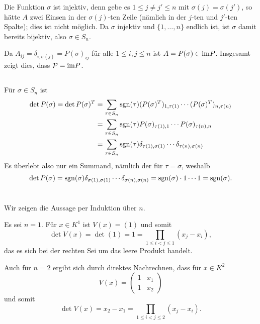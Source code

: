 \documentclass[a4paper,10pt]{article}
\begin{document}
Die Funktion $\sigma$ ist injektiv, denn gebe es $1 \leq j \neq j' \leq n$ mit $\sigma(j) = \sigma(j')$, so hätte $A$ zwei Einsen in der $\sigma(j)$-ten Zeile (nämlich in der $j$-ten und $j'$-ten Spalte); dies ist nicht möglich. Da $\sigma$ injektiv und $\{1, \dotsc, n\}$ endlich ist, ist $\sigma$ damit bereits bijektiv, also $\sigma \in S_n$.

Da $A_{ij} = \delta_{i,\sigma(j)} = P(\sigma)_{ij}$ für alle $1 \leq i,j \leq n$ ist $A = P(\sigma) \in \mathrm{im} P$. Insgesamt zeigt dies, dass $\mathcal{P} = \mathrm{im} P$.


\subsection{}
Für $\sigma \in S_n$ ist
\begin{align*}
 \det P(\sigma)
 = \det P(\sigma)^T
 &= \sum_{\tau \in S_n} \operatorname{sgn}(\tau) (P(\sigma)^T)_{1, \tau(1)} \dotsm (P(\sigma)^T)_{n, \tau(n)} \\
 &= \sum_{\tau \in S_n} \operatorname{sgn}(\tau) P(\sigma)_{\tau(1), 1} \dotsm P(\sigma)_{\tau(n),n} \\
 &= \sum_{\tau \in S_n} \operatorname{sgn}(\tau) \delta_{\tau(1), \sigma(1)} \dotsm \delta_{\tau(n),\sigma(n)}
\end{align*}
Es überlebt also nur ein Summand, nämlich der für $\tau = \sigma$, weshalb
\[
 \det P(\sigma)
 = \operatorname{sgn}(\sigma) \delta_{\sigma(1), \sigma(1)} \dotsm \delta_{\sigma(n),\sigma(n)}
 = \operatorname{sgn}(\sigma) \cdot 1 \dotsm 1
 = \operatorname{sgn}(\sigma).
\]





\section{}
Wir zeigen die Aussage per Induktion über $n$.

\begin{ia}
 Es sei $n = 1$. Für $x \in K^1$ ist $V(x) = (1)$ und somit
 \[
  \det V(x) = \det (1) = 1 = \prod_{1 \leq i < j \leq 1} (x_j - x_i),
 \]
 das es sich bei der rechten Sei um das leere Produkt handelt.
 
 Auch für $n = 2$ ergibt sich durch direktes Nachrechnen, dass für $x \in K^2$
 \[
  V(x) =
  \begin{pmatrix}
   1 & x_1 \\
   1 & x_2
  \end{pmatrix}
 \]
 und somit
 \[
  \det V(x) = x_2 - x_1 =  \prod_{1 \leq i < j \leq 2} (x_j - x_i).
 \]
\end{ia}
\end{document}
